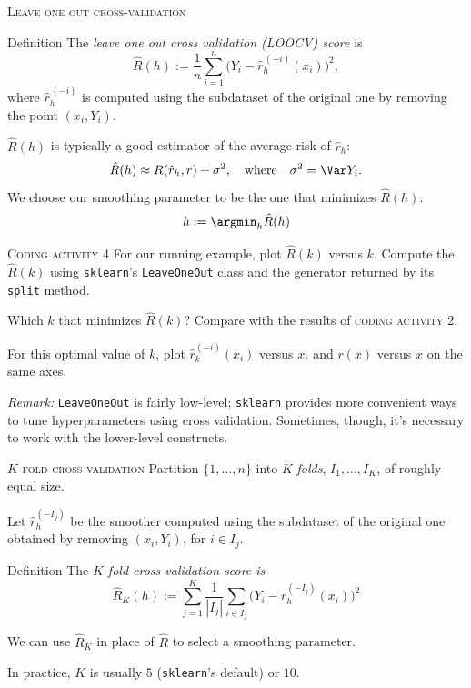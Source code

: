 \documentclass{beamer}
\begin{document}
\begin{frame}{\textsc{Leave one out cross-validation}}
    \begin{block}{Definition}
        The \emph{leave one out cross validation (LOOCV) score} is
        \[
            \hat R(h) := \frac1n\sum_{i=1}^n\big(Y_i - \hat r_h^{\,(-i)}(x_i)\big)^2,
        \]
        where $\hat r_h^{\,(-i)}$ is computed using the subdataset of the original one by removing the point $(x_i, Y_i)$.
    \end{block}
    \vspace{-1ex}$\hat R(h)$ is typically a good estimator of the average risk of $\hat r_h$:
    \[
        \hat R(h) \approx R(\hat r_h, r) + \sigma^2,\quad\text{where}\quad\sigma^2 = \Var Y_i.
    \]
    We choose our smoothing parameter to be the one that minimizes $\hat R(h)$:
    \[
        h := \argmin_h \hat R(h)
    \]
\end{frame}

\begin{frame}{\textsc{Coding activity 4}}
    For our running example, plot $\hat R(k)$ versus $k$. Compute the $\hat R(k)$ using
    \texttt{sklearn}'s \texttt{LeaveOneOut} class and the generator returned by its
    \texttt{split} method.
    
    Which $k$ that minimizes $\hat R(k)$? Compare with the results of \textsc{coding activity 2}.

    For this optimal value of $k$, plot $\hat r_k^{(-i)}(x_i)$ versus $x_i$ and $r(x)$ versus $x$ on the same axes.

    \textit{Remark:} \texttt{LeaveOneOut} is fairly low-level; \texttt{sklearn} provides more 
    convenient ways to tune hyperparameters using cross validation.
    Sometimes, though, it's necessary to work with the lower-level constructs.
\end{frame}

\begin{frame}{\textsc{$K$-fold cross validation}}
Partition $\{1,\ldots,n\}$ into $K$ \emph{folds}, $I_1,\ldots,I_K$, of roughly equal size.

Let $\hat r_h^{(-I_j)}$ be the smoother computed using the subdataset of the original one
obtained by removing $(x_i, Y_i)$, for $i\in I_j$.

\begin{block}{Definition}
    The \emph{$K$-fold cross validation score is}
    \[
        \hat{R}_K(h) := \sum_{j=1}^K\frac1{|I_j|}\sum_{i\in I_j}\big(Y_i - r_h^{(-I_j)}(x_i)\big)^2
    \]
\end{block}

We can use $\hat{R}_K$ in place of $\hat{R}$ to select a smoothing parameter.

In practice, $K$ is usually $5$ (\texttt{sklearn}'s default) or $10$.
\end{frame}
\end{document}
